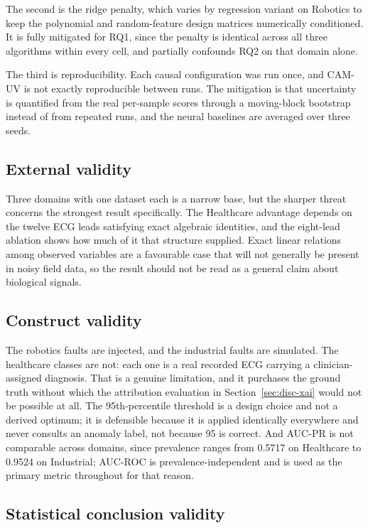The second is the ridge penalty, which varies by regression variant on Robotics to keep the polynomial and random-feature design matrices numerically conditioned. It is fully mitigated for RQ1, since the penalty is identical across all three algorithms within every cell, and partially confounds RQ2 on that domain alone.

The third is reproducibility. Each causal configuration was run once, and CAM-UV is not exactly reproducible between runs. The mitigation is that uncertainty is quantified from the real per-sample scores through a moving-block bootstrap instead of from repeated runs, and the neural baselines are averaged over three seeds.

\subsection{External validity}

Three domains with one dataset each is a narrow base, but the sharper threat concerns the strongest result specifically. The Healthcare advantage depends on the twelve ECG leads satisfying exact algebraic identities, and the eight-lead ablation shows how much of it that structure supplied. Exact linear relations among observed variables are a favourable case that will not generally be present in noisy field data, so the result should not be read as a general claim about biological signals.

\subsection{Construct validity}

The robotics faults are injected, and the industrial faults are simulated. The healthcare classes are not: each one is a real recorded ECG carrying a clinician-assigned diagnosis. That is a genuine limitation, and it purchases the ground truth without which the attribution evaluation in Section~\ref{sec:disc-xai} would not be possible at all. The 95th-percentile threshold is a design choice and not a derived optimum; it is defensible because it is applied identically everywhere and never consults an anomaly label, not because 95 is correct. And AUC-PR is not comparable across domains, since prevalence ranges from 0.5717 on Healthcare to 0.9524 on Industrial; AUC-ROC is prevalence-independent and is used as the primary metric throughout for that reason.

\subsection{Statistical conclusion validity}

